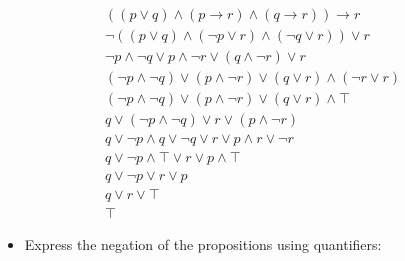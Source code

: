 \documentclass[11pt]{article}
\begin{document}
\begin{enumerate}
\begin{align}
((p\lor q) \land (p \to r) \land (q \to r)) \to r \\
\neg((p \lor q) \land (\neg p \lor r) \land (\neg q \lor r)) \lor r \\
\neg p \land \neg q \lor p \land \neg r \lor (q \land \neg r) \lor r \\
(\neg p \land \neg q) \lor (p \land \neg r) \lor (q \lor r) \land (\neg r \lor r) \\
(\neg p \land \neg q) \lor (p \land \neg r) \lor (q \lor r) \land \top \\
q \lor (\neg p \land \neg q) \lor r \lor (p \land \neg r) \\
q \lor \neg p \land q \lor \neg q \lor r \lor p \land r \lor \neg r \\
q \lor \neg p \land \top \lor r \lor p \land \top \\
q \lor \neg p \lor r \lor p \\
q \lor r \lor \top \\
\top
\end{align}
\end{enumerate}


\begin{itemize}
\item Express the negation of the propositions using quantifiers:
\end{itemize}
\end{document}
